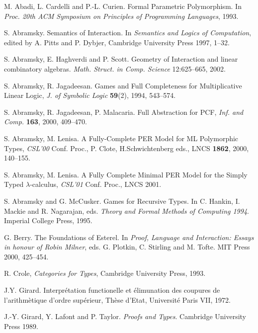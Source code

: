 \documentclass[a4paper,11pt]{article}
\begin{document}
\begin{thebibliography}{DDDD88}

M. Abadi, L. Cardelli and P.-L. Curien.
Formal Parametric Polymorphism.
In {\em Proc. 20th ACM Symposium on Principles of Programming
  Languages}, 1993.

S. Abramsky.
Semantics of Interaction.
In {\em Semantics and Logics of Computation},
edited by A. Pitts and P. Dybjer, Cambridge University Press 1997,
1--32.

S. Abramsky, E. Haghverdi and P. Scott.
Geometry of Interaction and linear combinatory algebras.
{\em Math. Struct. in Comp. Science} 12:625--665, 2002.

 S. Abramsky, R. Jagadeesan. Games and Full Completeness for
 Multiplicative Linear Logic,  {\em J. of Symbolic  Logic} {\bf 59}(2), 1994, 543--574.


 S. Abramsky, R. Jagadeesan, P. Malacaria. Full Abstraction
for PCF,  {\em Inf. and Comp.} {\bf 163}, 2000, 409--470.



 S. Abramsky, M. Lenisa. A Fully-Complete PER Model for ML Polymorphic Types,  {\em CSL'00} Conf. Proc., P. Clote, H.Schwichtenberg eds., LNCS {\bf 1862},
 2000, 140--155.





 S. Abramsky, M. Lenisa. A Fully Complete Minimal
  PER Model for the Simply Typed $\lambda$-calculus, {\em CSL'01}
  Conf. Proc., LNCS 2001.

S. Abramsky and G. McCusker.
Games for Recursive Types.
In C. Hankin, I. Mackie and R. Nagarajan, eds. {\em Theory and Formal
  Methods of Computing 1994}. Imperial College Press, 1995.

G. Berry.
The Foundations of Esterel.
In {\em Proof, Language and Interaction: Essays in honour of Robin
  Milner}, eds. G. Plotkin, C. Stirling and M. Tofte.
MIT Press 2000, 425--454.

 R. Crole, {\em Categories for Types}, Cambridge University Press, 1993.

 J.Y. Girard. Interpr\'etation functionelle et \'elimunation des coupures de l'arithm\`etique d'ordre sup\'erieur, Th\`ese d'Etat, Universit\'e Paris VII, 1972.

J.-Y. Girard, Y. Lafont and P. Taylor.
{\em Proofs and Types}.
Cambridge University Press 1989.


\end{thebibliography}
\end{document}
